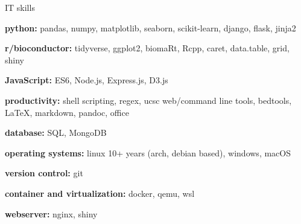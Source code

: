 

\begin{cvskills}
  \cvskill
    {IT skills} %
    {
      \begin{cvitems}
        \item {\textbf{python:} pandas, numpy, matplotlib, seaborn, scikit-learn, django, flask, jinja2}
        \item {\textbf{r/bioconductor:} tidyverse, ggplot2, biomaRt, Rcpp, caret, data.table, grid, shiny}
        \item {\textbf{JavaScript:} ES6, Node.js, Express.js, D3.js}
        \item {\textbf{productivity:} shell scripting, regex, ucsc web/command line tools, bedtools, LaTeX, \newline markdown, pandoc, office}
        \item {\textbf{database:} SQL, MongoDB}
        \item {\textbf{operating systems:} linux 10+ years (arch, debian based), windows, macOS}
        \item {\textbf{version control:} git}
        \item {\textbf{container and virtualization:} docker, qemu, wsl}
        \item {\textbf{webserver:} nginx, shiny}
      \end{cvitems}
      }
      

\end{cvskills}
